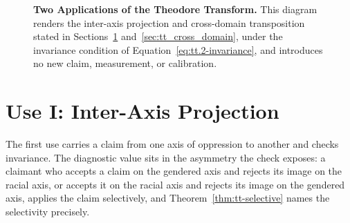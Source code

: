 \begin{figure}[htbp]
\centering
{}
\caption[Two applications of the Theodore Transform]{\textbf{Two Applications of the Theodore Transform.} This diagram renders the inter-axis projection and cross-domain transposition stated in Sections~\ref{sec:tt_inter_axis} and~\ref{sec:tt_cross_domain}, under the invariance condition of Equation~\ref{eq:tt.2-invariance}, and introduces no new claim, measurement, or calibration.}
\label{fig:tt_applications}
\end{figure}

\section{Use I: Inter-Axis Projection}
\label{sec:tt_inter_axis}

The first use carries a claim from one axis of oppression to another and checks invariance. The
diagnostic value sits in the asymmetry the check exposes: a claimant who accepts a claim on the
gendered axis and rejects its image on the racial axis, or accepts it on the racial axis and
rejects its image on the gendered axis, applies the claim selectively, and
Theorem~\ref{thm:tt-selective} names the selectivity precisely.

